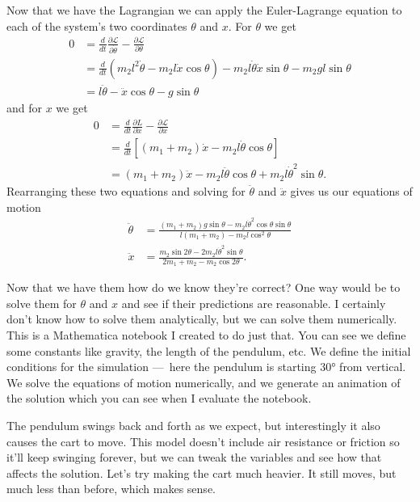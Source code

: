 \documentclass{article}
\begin{document}
Now that we have the Lagrangian we can apply the Euler-Lagrange equation to each of the system's two coordinates $\theta$ and $x$. For $\theta$ we get \begin{align*}
  0 & = \frac{d}{d t} \frac{\partial \mathcal{L}}{\partial \dot{\theta}} - \frac{\partial \mathcal{L}}{\partial \theta}                 \\
    & = \frac{d}{d t} (m_2 l^2 \dot{\theta} - m_2 l \dot{x} \cos \theta) - m_2 l \dot{\theta} \dot{x} \sin \theta - m_2 g l \sin \theta \\
    & = l \ddot{\theta} - \ddot{x} \cos \theta - g \sin \theta
\end{align*} and for $x$ we get \begin{align*}
  0 & = \frac{d}{d t} \frac{\partial L}{\partial \dot{x}} - \frac{\partial \mathcal{L}}{\partial x} \\
    & = \frac{d}{d t} [(m_1 + m_2) \dot{x} - m_2 l \dot{\theta} \cos \theta]                        \\
    & = (m_1 + m_2) \ddot{x} - m_2 l \ddot{\theta} \cos \theta + m_2 l \dot{\theta}^2 \sin \theta.
\end{align*} Rearranging these two equations and solving for $\ddot{\theta}$ and $\ddot{x}$ gives us our equations of motion \begin{align*}
\ddot{\theta} & = \frac{(m_1 + m_2) g \sin \theta - m_2 l \dot{\theta}^2 \cos \theta \sin \theta}{l (m_1 + m_2) - m_2 l \cos^2 \theta} \\
\ddot{x}      & = \frac{m_2 \sin 2 \theta - 2 m_2 l \dot{\theta}^2 \sin \theta}{2 m_1 + m_2 - m_2 \cos 2 \theta}.
\end{align*}

Now that we have them how do we know they're correct? One way would be to solve them for $\theta$ and $x$ and see if their predictions are reasonable. I certainly don't know how to solve them analytically, but we can solve them numerically. This is a Mathematica notebook I created to do just that. You can see we define some constants like gravity, the length of the pendulum, etc. We define the initial conditions for the simulation — here the pendulum is starting $\ang{30}$ from vertical. We solve the equations of motion numerically, and we generate an animation of the solution which you can see when I evaluate the notebook.

The pendulum swings back and forth as we expect, but interestingly it also causes the cart to move. This model doesn't include air resistance or friction so it'll keep swinging forever, but we can tweak the variables and see how that affects the solution. Let's try making the cart much heavier. It still moves, but much less than before, which makes sense.
\end{document}
